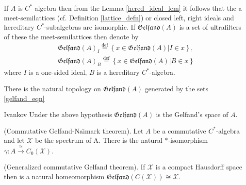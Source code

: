 \documentclass{beamer}
\theoremstyle{plain}
\newcommand{\be}{\begin{equation}}
\newcommand{\ee}{\end{equation}}
\newcommand{\sX}{\mathcal{X}}       %
\newcommand{\bydef}{\stackrel{\mathrm{def}}{=}}
\begin{document}
\begin{frame}
	
	If $A$ is $C^*$-algebra then from the Lemma \ref{hered_ideal_lem} it follows that the a meet-semilattices (cf. Definition \ref{lattice_defn}) or closed left, right ideals and hereditary $C^*$-subalgebras are isomorphic.
If  $\mathfrak{Gelfand}\left(A \right)$  is a set of ultrafilters of these the meet-semilattices then denote by
\be\label{gelfand_eqn}
\begin{split}
	\mathfrak{Gelfand}\left(A \right)_{I} \bydef \left\{\left. x \in \mathfrak{Gelfand}\left(A \right)\right| I \in x\right\},\\
	\mathfrak{Gelfand}\left(A \right)_{B} \bydef \left\{\left. x \in \mathfrak{Gelfand}\left(A \right)\right| B \in x\right\}
\end{split}
\ee
where $I$ is a one-sided ideal, $B$ is a hereditary $C^*$-algebra.	
\begin{lemma}
	There is the natural topology on  $\mathfrak{Gelfand}\left(A \right)$ generated by the sets \eqref{gelfand_eqn}
\end{lemma}
	\begin{definition}\label{gelfand_space_defn}\alert{Ivankov}
	Under the above hypothesis $\mathfrak{Gelfand}\left(A \right)$ is the \alert{Gelfand's space} of $A$.
\end{definition}

\end{frame}
\begin{frame}
\begin{theorem}\label{gelfand-naimark_thm}\cite{arveson:c_alg_invt} (Commutative Gelfand-Na\u{\i}mark theorem). 
	Let $A$ be a commutative $C^*$-algebra and let $\mathcal{X}$ be the spectrum of A. There is the natural $*$-isomorphism $\gamma:A \xrightarrow{\cong} C_0(\mathcal{X})$.
\end{theorem}


\begin{lemma} (Generalized commutative Gelfand theorem).
	If $\sX$ is a compact Hausdorff space then  is a natural  homeomorphism $\mathfrak{Gelfand}\left(C\left( \sX\right)  \right)\cong \sX$.
\end{lemma}
\end{frame}
\end{document}
